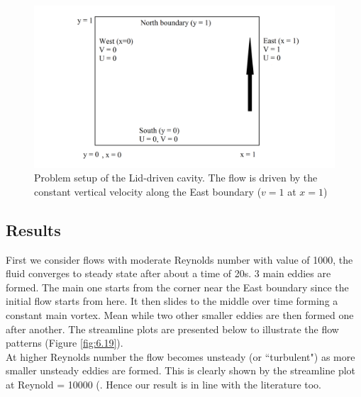 \begin{figure}[H]
	\centering
	\includegraphics[width=5.5in]{figures/Lid_driven_set_up.png}
	\caption{Problem setup of the Lid-driven cavity. The flow is driven by the constant vertical velocity along the East boundary ($v=1$ at $x=1$)  }	
\label{fig:6.18}
\end{figure}

\subsection{Results}
First we consider flows with moderate Reynolds number with value of 1000, the fluid converges to steady state after about a time of 20s. 3 main eddies are formed. The main one starts from the corner near the East boundary since the initial flow starts from here. It then slides to the middle over time forming a constant main vortex. Mean while two other smaller eddies are then formed one after another. The streamline plots are presented below to illustrate the flow patterns (Figure \ref{fig:6.19}).\\

At higher Reynolds number the flow becomes unsteady (or ``turbulent") as more smaller unsteady eddies are formed. This is clearly shown by the streamline plot at Reynold = 10000 (. Hence our result is in line with the literature too.\\

